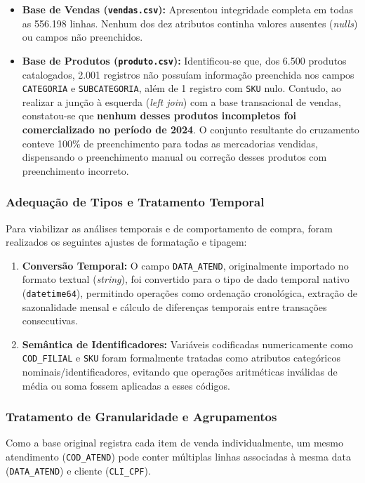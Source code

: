 \begin{itemize}[leftmargin=*]
    \item \textbf{Base de Vendas (\texttt{vendas.csv}):} Apresentou integridade completa em todas as 556.198 linhas. Nenhum dos dez atributos continha valores ausentes (\textit{nulls}) ou campos não preenchidos.
    \item \textbf{Base de Produtos (\texttt{produto.csv}):} Identificou-se que, dos 6.500 produtos catalogados, 2.001 registros não possuíam informação preenchida nos campos \texttt{CATEGORIA} e \texttt{SUBCATEGORIA}, além de 1 registro com \texttt{SKU} nulo. Contudo, ao realizar a junção à esquerda (\textit{left join}) com a base transacional de vendas, constatou-se que \textbf{nenhum desses produtos incompletos foi comercializado no período de 2024}. O conjunto resultante do cruzamento conteve 100\% de preenchimento para todas as mercadorias vendidas, dispensando o preenchimento manual ou correção desses produtos com preenchimento incorreto.
\end{itemize}

\subsubsection{Adequação de Tipos e Tratamento Temporal}
Para viabilizar as análises temporais e de comportamento de compra, foram realizados os seguintes ajustes de formatação e tipagem:
\begin{enumerate}[leftmargin=*]
    \item \textbf{Conversão Temporal:} O campo \texttt{DATA\_ATEND}, originalmente importado no formato textual (\textit{string}), foi convertido para o tipo de dado temporal nativo (\texttt{datetime64}), permitindo operações como ordenação cronológica, extração de sazonalidade mensal e cálculo de diferenças temporais entre transações consecutivas.
    \item \textbf{Semântica de Identificadores:} Variáveis codificadas numericamente como \texttt{COD\_FILIAL} e \texttt{SKU} foram formalmente tratadas como atributos categóricos nominais/identificadores, evitando que operações aritméticas inválidas de média ou soma fossem aplicadas a esses códigos.
\end{enumerate}

\subsubsection{Tratamento de Granularidade e Agrupamentos}
Como a base original registra cada item de venda individualmente, um mesmo atendimento (\texttt{COD\_ATEND}) pode conter múltiplas linhas associadas à mesma data (\texttt{DATA\_ATEND}) e cliente (\texttt{CLI\_CPF}). 

